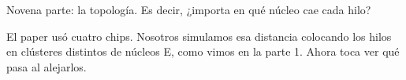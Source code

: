 Novena parte: la topología. Es decir, ¿importa en qué núcleo cae cada hilo?

El paper usó cuatro chips. Nosotros simulamos esa distancia colocando los hilos en clústeres distintos de núcleos E, como vimos en la parte 1. Ahora toca ver qué pasa al alejarlos.

